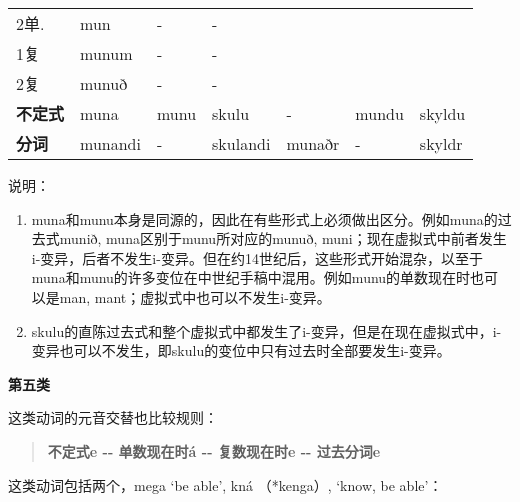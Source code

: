 \begin{longtable}{lllllll}
  2单.          & mun                    & -                      & -        & ~      & ~      & ~       \\
  1复           & munum                  & -                      & -        & ~      & ~      & ~       \\
  2复           & munuð                  & -                      & -        & ~      & ~      & ~       \\
  \textbf{不定式} & muna                   & munu                   & skulu    & -      & mundu  & skyldu  \\
  \textbf{分词}  & munandi                & -                      & skulandi & munaðr & -      & skyldr  \\
\end{longtable}

说明：

\begin{enumerate}
  \def\labelenumi{\arabic{enumi})}
  \item
        muna和munu本身是同源的，因此在有些形式上必须做出区分。例如muna的过去式munið,
        muna区别于munu所对应的munuð,
        muni；现在虚拟式中前者发生i-变异，后者不发生i-变异。但在约14世纪后，这些形式开始混杂，以至于muna和munu的许多变位在中世纪手稿中混用。例如munu的单数现在时也可以是man,
        mant；虚拟式中也可以不发生i-变异。
  \item
        skulu的直陈过去式和整个虚拟式中都发生了i-变异，但是在现在虚拟式中，i-变异也可以不发生，即skulu的变位中只有过去时全部要发生i-变异。
\end{enumerate}

\textbf{第五类}

这类动词的元音交替也比较规则：

\begin{quote}
  \textbf{不定式e -\/- 单数现在时á -\/- 复数现在时e -\/- 过去分词e}
\end{quote}

这类动词包括两个，mega `be able‌', kná （*kenga）, `know, be able‌'：

